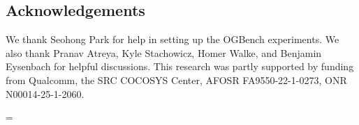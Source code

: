 \documentclass[twocolumn,small authors]{paper}
\begin{document}






\subsection*{Acknowledgements}

We thank Seohong Park for help in setting up the OGBench experiments.
We also thank Pranav Atreya, Kyle Stachowicz, Homer Walke, and Benjamin Eysenbach for helpful discussions.
This research was partly supported by funding from Qualcomm, the SRC COCOSYS Center, AFOSR FA9550-22-1-0273, ONR N00014-25-1-2060.

\bibsep=\smallskipamount
 

\appendix
\onecolumn


\end{document}
